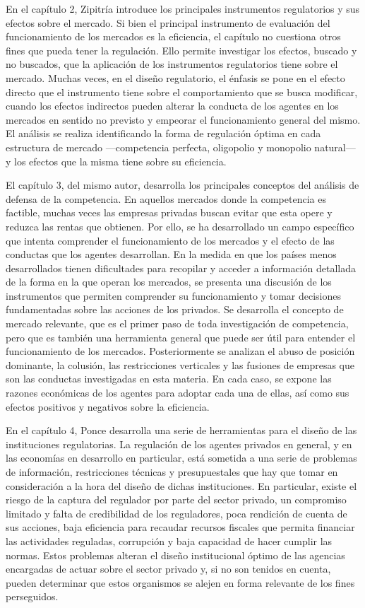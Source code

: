 \documentclass[
  12pt,
  spanish,
]{book}
\begin{document}
En el capítulo 2, Zipitría introduce los principales instrumentos regulatorios y sus efectos sobre el mercado. Si bien el principal instrumento de evaluación del funcionamiento de los mercados es la eficiencia, el capítulo no cuestiona otros fines que pueda tener la regulación. Ello permite investigar los efectos, buscado y no buscados, que la aplicación de los instrumentos regulatorios tiene sobre el mercado. Muchas veces, en el diseño regulatorio, el énfasis se pone en el efecto directo que el instrumento tiene sobre el comportamiento que se busca modificar, cuando los efectos indirectos pueden alterar la conducta de los agentes en los mercados en sentido no previsto y empeorar el funcionamiento general del mismo. El análisis se realiza identificando la forma de regulación óptima en cada estructura de mercado ---competencia perfecta, oligopolio y monopolio natural--- y los efectos que la misma tiene sobre su eficiencia.

El capítulo 3, del mismo autor, desarrolla los principales conceptos del análisis de defensa de la competencia. En aquellos mercados donde la competencia es factible, muchas veces las empresas privadas buscan evitar que esta opere y reduzca las rentas que obtienen. Por ello, se ha desarrollado un campo específico que intenta comprender el funcionamiento de los mercados y el efecto de las conductas que los agentes desarrollan. En la medida en que los países menos desarrollados tienen dificultades para recopilar y acceder a información detallada de la forma en la que operan los mercados, se presenta una discusión de los instrumentos que permiten comprender su funcionamiento y tomar decisiones fundamentadas sobre las acciones de los privados. Se desarrolla el concepto de mercado relevante, que es el primer paso de toda investigación de competencia, pero que es también una herramienta general que puede ser útil para entender el funcionamiento de los mercados. Posteriormente se analizan el abuso de posición dominante, la colusión, las restricciones verticales y las fusiones de empresas que son las conductas investigadas en esta materia. En cada caso, se expone las razones económicas de los agentes para adoptar cada una de ellas, así como sus efectos positivos y negativos sobre la eficiencia.

En el capítulo 4, Ponce desarrolla una serie de herramientas para el diseño de las instituciones regulatorias. La regulación de los agentes privados en general, y en las economías en desarrollo en particular, está sometida a una serie de problemas de información, restricciones técnicas y presupuestales que hay que tomar en consideración a la hora del diseño de dichas instituciones. En particular, existe el riesgo de la captura del regulador por parte del sector privado, un compromiso limitado y falta de credibilidad de los reguladores, poca rendición de cuenta de sus acciones, baja eficiencia para recaudar recursos fiscales que permita financiar las actividades reguladas, corrupción y baja capacidad de hacer cumplir las normas. Estos problemas alteran el diseño institucional óptimo de las agencias encargadas de actuar sobre el sector privado y, si no son tenidos en cuenta, pueden determinar que estos organismos se alejen en forma relevante de los fines perseguidos.
\end{document}

